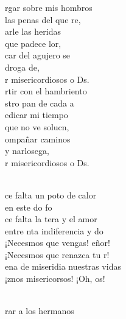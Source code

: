 \begin{cancion}%
	rgar sobre mis hombros \\
	 las penas del que re,\\
	arle las heridas\\
	 que padece lor,\\
	car del agujero se \\
	 droga de,\\
	r misericordiosos o Ds.\\
\jump
	rtir con el hambriento \\
	stro pan de cada a\\
	edicar mi tiempo \\
	 que no ve solucn, \\
	ompañar caminos \\
	y narlosega,\\
	r misericordiosos o Ds.\\\jump\\
	\begin{chorus}%
	ce falta un poto de calor \\
	en este do fo\\
	ce falta la tera y el amor \\
	entre nta indiferencia y do\\
	¡Necesmos que vengas! eñor!\\
	¡Necesmos que renazca tu r!\\
	ena de miseridia nuestras vidas\\
	¡znos misericorsos! ¡Oh, os! \\
	\end{chorus}%
	\jump\\
	rar a los hermanos \\

\end{cancion}
